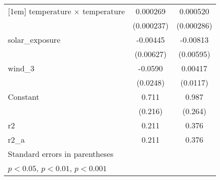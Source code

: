 {\begin{tabular}{l*{2}{c}}
[1em]
temperature $\times$ temperature&    0.000269         &    0.000520         \\
                    &  (0.000237)         &  (0.000286)         \\
[1em]
solar\_exposure      &    -0.00445         &    -0.00813         \\
                    &   (0.00627)         &   (0.00595)         \\
[1em]
wind\_3              &     -0.0590         &     0.00417         \\
                    &    (0.0248)         &    (0.0117)         \\
[1em]
Constant            &       0.711\sym{*}  &       0.987\sym{*}  \\
                    &     (0.216)         &     (0.264)         \\
\hline
r2                  &       0.211         &       0.376         \\
r2\_a                &       0.211         &       0.376         \\
\hline\hline
\multicolumn{3}{l}{\footnotesize Standard errors in parentheses}\\
\multicolumn{3}{l}{\footnotesize \sym{*} \(p<0.05\), \sym{**} \(p<0.01\), \sym{***} \(p<0.001\)}\\
\end{tabular}
}

